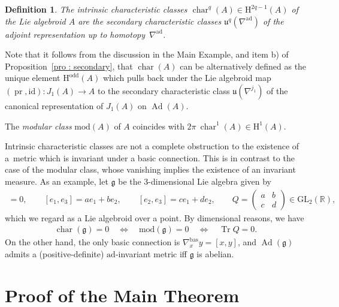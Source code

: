 \documentclass[pdftex]{sigma}
\numberwithin{equation}{section}
\newcommand{\R}{\mathbb{R}}
\newcommand{\pr}{\operatorname{pr}}
\newcommand{\HH}{\mathrm{H}}
\newcommand{\id}{\mathrm{id}}
\newcommand{\8}{\infty}
\newtheorem*{defi}{Definition}}
\begin{document}
\begin{defi} The {\it intrinsic characteristic classes} $\operatorname{char}^q(A) \in \HH^{2q-1}(A)$ of the Lie algebroid $A$ are the secondary characteristic classes $\mathfrak{u}^q(\nabla^{\mathrm{ad}})$ of the adjoint representation up to homotopy~$\nabla^{\mathrm{ad}}$.
\end{defi}
Note that it follows from the discussion in the Main Example, and item b) of Proposition~\ref{pro : secondary}, that $\operatorname{char}(A)$ can be alternatively defined as the unique element $\HH^{\mathrm{odd}}(A)$ which pulls back under the Lie algebroid map $(\pr,\id)\colon J_1(A) \to A$ to the secondary characteristic class $\mathfrak{u}(\nabla^{j_1})$ of the canonical representation of $J_1(A)$ on $\operatorname{Ad}(A)$.

\begin{example*}The \emph{modular class} $\mathrm{mod}(A)$ of $A$ coincides with $2\pi\ \operatorname{char}^1(A) \in \HH^{1}(A)$.
\end{example*}

\begin{remark*} Intrinsic characteristic classes are not a complete obstruction to the existence of a~metric which is invariant under a basic connection. This is in contrast to the case of the modular class, whose vanishing implies the existence of an invariant measure. As an example, let $\mathfrak{g}$ be the 3-dimensional Lie algebra given by
 \begin{gather*}
 [e_1,e_2] = 0, \qquad [e_1,e_3] = ae_1+be_2, \qquad [e_2,e_3] = ce_1+de_2, \qquad Q = \left( \begin{matrix}
 a & b\\
 c & d
 \end{matrix}
 \right) \in \mathrm{GL}_2(\R),
 \end{gather*}which we regard as a Lie algebroid over a point. By dimensional reasons, we have
 \begin{gather*}
 \operatorname{char}(\mathfrak{g}) = 0 \quad \Longleftrightarrow \quad \mathrm{mod}(\mathfrak{g})=0 \quad \Longleftrightarrow \quad \operatorname{Tr} Q=0.
 \end{gather*}On the other hand, the only basic connection is $\nabla^{\mathrm{bas}}_xy = [x,y]$, and $\operatorname{Ad}(\mathfrak{g})$ admits a (positive-definite) $\mathrm{ad}$-invariant metric iff $\mathfrak{g}$ is abelian.
\end{remark*}

\section{Proof of the Main Theorem}\label{section3}
\end{document}
